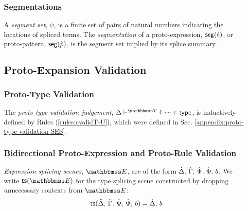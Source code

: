 \subsubsection{Segmentations}
A \emph{segment set}, $\psi$, is a finite set of pairs of natural numbers indicating the locations of spliced terms. The \emph{segmentation} of a proto-expression, $\mathsf{seg}(\grave{e})$, or proto-pattern, $\mathsf{seg}(\grave{p})$, is the segment set implied by its splice summary.

\subsection{Proto-Expansion Validation}\label{appendix:proto-expansion-validation-BS}
\subsubsection{Proto-Type Validation}
The \emph{proto-type validation judgement}, $\cvalidT{\Delta}{\tscenev}{\ctau}{\tau}$, is inductively defined by Rules (\ref{rules:cvalidT-U}), which were defined in Sec. \ref{appendix:proto-type-validation-SES}.

\subsubsection{Bidirectional Proto-Expression and Proto-Rule Validation}
\emph{Expression splicing scenes}, $\escenev$, are of the form $\hat{\Delta};\,\hat{\Gamma};\,\hat{\Psi};\,\hat\Phi;\,b$. We write $\tsfrom{\escenev}$ for the type splicing scene constructed by dropping unnecessary contexts from $\escenev$:
\[\mathsf{ts}(\hat{\Delta};\,\hat{\Gamma};\,\hat{\Psi};\,\hat\Phi;\,b) = \hat{\Delta};\,b\]

